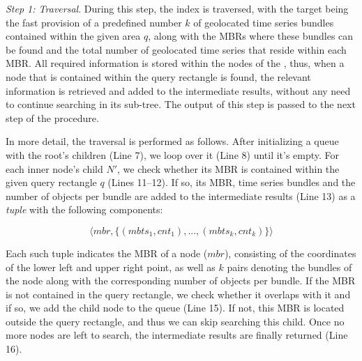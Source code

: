 \emph{Step 1: \btsr Traversal}.
During this step, the \btsr index is traversed, with the target being the fast provision of a predefined number $k$ of geolocated time series bundles contained within the given area $q$, along with the MBRs where these bundles can be found and the total number of geolocated time series that reside within each MBR. All required information is stored within the nodes of the \btsr, thus, when a node that is contained within the query rectangle is found, the relevant information is retrieved and added to the intermediate results, without any need to continue searching in its sub-tree. The output of this step is passed to the next step of the procedure. 





In more detail, the traversal is performed as follows. After initializing a queue with the root's children (Line 7), we loop over it (Line 8) until it's empty. For each inner node's child $N'$, we check whether its MBR is contained within the given query rectangle $q$ (Lines 11--12). If so, its MBR, time series bundles and the number of objects per bundle are added to the intermediate results (Line 13) as a {\em tuple} with the following components:

\begin{equation*}
\langle mbr, \{ (mbts_1,cnt_1), ..., (mbts_k, cnt_k) \} \rangle
\end{equation*}

\noindent Each such tuple indicates the MBR of a node ($mbr$), consisting of the coordinates of the lower left and upper right point, as well as $k$ pairs denoting the bundles of the node along with the corresponding number of objects per bundle. If the MBR is not contained in the query rectangle, we check whether it overlaps with it and if so, we add the child node to the queue (Line 15). If not, this MBR is located outside the query rectangle, and thus we can skip searching this child. Once no more nodes are left to search, the intermediate results are finally returned (Line 16).

